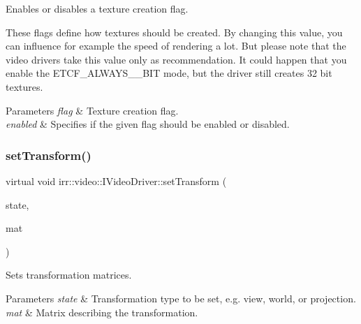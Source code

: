Enables or disables a texture creation flag. 

These flags define how textures should be created. By changing this value, you can influence for example the speed of rendering a lot. But please note that the video drivers take this value only as recommendation. It could happen that you enable the E\+T\+C\+F\+\_\+\+A\+L\+W\+A\+Y\+S\+\_\+\_\+\+B\+IT mode, but the driver still creates 32 bit textures. 
\begin{DoxyParams}{Parameters}
{\em flag} & Texture creation flag. \\
\hline
{\em enabled} & Specifies if the given flag should be enabled or disabled. \\
\hline
\end{DoxyParams}
\mbox{\label{classirr_1_1video_1_1IVideoDriver_aaf6e88bedf7b91666a2bd34f46e092fc}} 
\subsubsection{\texorpdfstring{set\+Transform()}{setTransform()}\hspace{0.1cm}{\footnotesize\ttfamily [1/2]}}
{\footnotesize\ttfamily virtual void irr\+::video\+::\+I\+Video\+Driver\+::set\+Transform (\begin{DoxyParamCaption}\item[{\hyperlink{namespaceirr_1_1video_a15b57657a320243be03ae6f66fcff43d}{E\+\_\+\+T\+R\+A\+N\+S\+F\+O\+R\+M\+A\+T\+I\+O\+N\+\_\+\+S\+T\+A\+TE}}]{state,  }\item[{const \hyperlink{namespaceirr_1_1core_a4c9d4e29899535971052810954a14431}{core\+::matrix4} \&}]{mat }\end{DoxyParamCaption})\hspace{0.3cm}{\ttfamily [pure virtual]}}



Sets transformation matrices. 


\begin{DoxyParams}{Parameters}
{\em state} & Transformation type to be set, e.\+g. view, world, or projection. \\
\hline
{\em mat} & Matrix describing the transformation. \\
\hline
\end{DoxyParams}
\mbox{\label{classirr_1_1video_1_1IVideoDriver_aaf6e88bedf7b91666a2bd34f46e092fc}} 
